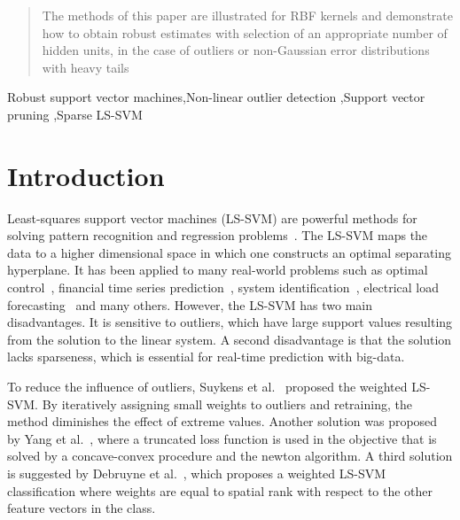 \documentclass[preprint,12pt]{elsarticle}
\begin{document}
\begin{frontmatter}
\begin{abstract}
			The methods of this paper are illustrated for RBF kernels and demonstrate how to obtain
			robust estimates with selection of an appropriate number of hidden units, in the case of
			outliers or non-Gaussian error distributions with heavy tails
			
		\end{abstract}
		
		\begin{keyword}
			Robust support vector machines\sep Non-linear outlier detection \sep Support vector pruning \sep Sparse LS-SVM 
		\end{keyword}
	\end{frontmatter}
	
	
	\section{Introduction}
	
	Least-squares support vector machines (LS-SVM) are powerful methods for solving pattern recognition and regression problems~\cite{suykens2002least}. The LS-SVM maps the data to a higher dimensional space in which one constructs an optimal separating hyperplane. It has been applied to many real-world problems such as optimal control~\cite{suykens2001optimal}, financial time series prediction~\cite{van2001financial}, system identification~\cite{goethals2005identification}, electrical load forecasting~\cite{espinoza2006fixed} and many others. However, the LS-SVM has two main disadvantages. It is sensitive to outliers, which have large support values resulting from the solution to the linear system. A second disadvantage is that the solution lacks sparseness, which is essential for real-time prediction with big-data.
	
	To reduce the influence of outliers, Suykens et al.~\cite{suykens2002weighted} proposed the weighted LS-SVM. By iteratively assigning small weights to outliers and retraining, the method diminishes the effect of extreme values. Another solution was proposed by Yang et al.~\cite{yang2014robust}, where a truncated loss function is used in the objective that is solved by a concave-convex procedure and the newton algorithm. A third solution is suggested by Debruyne et al.~\cite{debruyne2009robustified}, which proposes a weighted LS-SVM classification where weights are equal to spatial rank with respect to the other feature vectors in the class.
	
\end{document}

